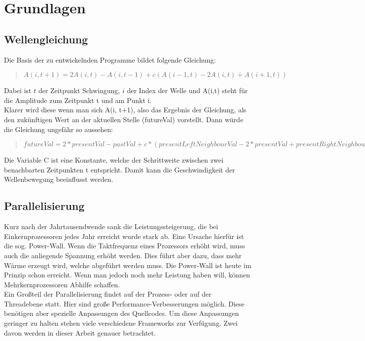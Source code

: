 
\section{Grundlagen}

\subsection{Wellengleichung}\label{sec:wave_equation}
Die Basis der zu entwickelnden Programme bildet folgende Gleichung:
\begin{quote}
	$A(i, t + 1) = 2A(i, t) - A(i, t - 1) + c(A(i - 1, t) - 2A(i, t) + A(i + 1, t))$
\end{quote}
Dabei ist $t$ der Zeitpunkt Schwingung, $i$ der Index der Welle und A(i,t) steht für die Amplitude zum Zeitpunkt t und am Punkt i.\\
Klarer wird diese wenn man sich A(i, t+1), also das Ergebnis der Gleichung, als den zukünftigen Wert an der aktuellen Stelle (futureVal) vorstellt. Dann würde die Gleichung ungefähr so aussehen:
\begin{quote}
	$futureVal = 2 * presentVal - pastVal + c * (presentLeftNeighbourVal - 2 * presentVal + presentRightNeighbourVal)$
\end{quote} 
Die Variable C ist eine Konstante, welche der Schrittweite zwischen zwei benachbarten Zeitpunkten t entspricht. Damit kann die Geschwindigkeit der Wellenbewegung beeinflusst werden.

\subsection{Parallelisierung}
Kurz nach der Jahrtausendwende sank die Leistungssteigerung, die bei Einkernprozessoren jedes Jahr erreicht wurde stark ab. Eine Ursache hierfür ist die sog. Power-Wall. Wenn die Taktfrequenz eines Prozessors erhöht wird, muss auch die anliegende Spannung erhöht werden. Dies führt aber dazu, dass mehr Wärme erzeugt wird, welche abgeführt werden muss. Die Power-Wall ist heute im Prinzip schon erreicht. Wenn man jedoch noch mehr Leistung haben will, können Mehrkernprozessoren Abhilfe schaffen.\\
Ein Großteil der Parallelisierung findet auf der Prozess- oder auf der Threadebene statt. Hier sind große Performance-Verbesserungen möglich. Diese benötigen aber spezielle Anpassungen des Quellcodes. Um diese Anpassungen geringer zu halten stehen viele verschiedene Frameworks zur Verfügung. Zwei davon werden in dieser Arbeit genauer betrachtet.

